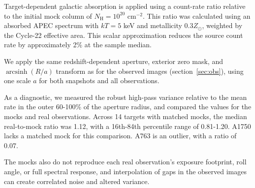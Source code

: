 Target-dependent galactic absorption is applied using a count-rate ratio relative to the initial mock column of $N_\text{H} = 10^{20}$ cm$^{-2}$.
This ratio was calculated using an absorbed APEC spectrum with $kT = 5$ keV and metallicity $0.3 Z_\odot$, weighted by the Cycle-22 effective area.
This scalar approximation reduces the source count rate by approximately 2\% at the sample median.

We apply the same redshift-dependent aperture, exterior zero mask, and $\operatorname{arcsinh}(R/a)$ transform as for the observed images (section~\ref{sec:obs}), using one scale $a$ for both snapshots and all observations.

As a diagnostic, we measured the robust high-pass variance relative to the mean rate in the outer 60-100\% of the aperture radius, and compared the values for the mocks and real observations.
Across 14 targets with matched mocks, the median real-to-mock ratio was 1.12, with a 16th-84th percentile range of 0.81-1.20.
A1750 lacks a matched mock for this comparison.
A763 is an outlier, with a ratio of 0.07.

The mocks also do not reproduce each real observation's exposure footprint, roll angle, or full spectral response, and interpolation of gaps in the observed images can create correlated noise and altered variance.

